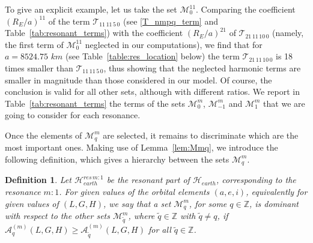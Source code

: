 \documentclass[12pt,reqno]{amsart}
\numberwithin{equation}{section}
\newtheorem{definition}[theorem]{Definition}
\def\M{{\mathcal M}}
\begin{document}
To give an explicit example, let us take the set $\mathcal{M}^{11}_0$. Comparing the coefficient $(R_E/a)^{1\!1}$
of the term $\mathcal{T}_{1\!1\, 1\!1\, 5\,0}$ (see \eqref{T_nmpq_term} and Table~\ref{tab:resonant_terms})
with the coefficient $(R_E/a)^{2\!1}$ of $\mathcal{T}_{2\!1\, 1\!1\, 1\!0\,0}$
(namely, the first term of $\mathcal{M}^{11}_0$ neglected in our computations), we find that for $a=8524.75$ $km$
(see Table~\ref{table:res_location} below) the term $\mathcal{T}_{2\!1\, 1\!1\, 1\!0\,0}$
is 18 times smaller than $\mathcal{T}_{1\!1\, 1\!1\, 5\,0}$, thus showing that
the neglected harmonic terms are smaller in magnitude than those considered in our model.
Of course, the conclusion is valid for all other sets, although with different ratios.
We report in Table~\ref{tab:resonant_terms} the terms of the sets $\mathcal{M}^m_0$, $\mathcal{M}^m_{-1}$ and
$\mathcal{M}^m_1$ that we are going to consider for each resonance.


Once the elements of $\mathcal{M}^m_q$ are selected, it remains to discriminate which are the most important ones.
Making use of Lemma~\ref{lem:Mmq}, we introduce the following definition, which gives a hierarchy between the
sets $\M_q^m$.

\begin{definition} \label{def_dominant}
Let $\mathcal{H}_{earth}^{res\,m:1}$ be the resonant part of $\mathcal{H}_{earth}$, corresponding to the resonance $m:1$.
For given values of  the orbital elements $(a,e,i)$, equivalently for given values of $(L,G,H)$,
we say that a set $\mathcal{M}^m_q$, for some $q \in \mathbb{Z}$,
is {\it dominant} with respect to the other sets $\mathcal{M}^m_{\widetilde{q}}$,
where $\widetilde{q} \in \mathbb{Z}$ with $\widetilde{q} \neq q$, if $\mathcal{A}^{(m)}_q(L,G,H) \geq \mathcal{A}^{(m)}_{\widetilde{q}}(L,G,H)$ for all $\widetilde{q} \in  \mathbb{Z}$.
\end{definition}
\end{document}
